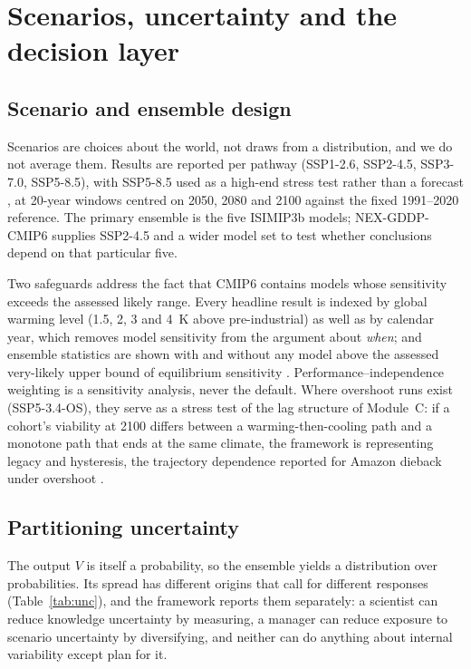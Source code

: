 \section{Scenarios, uncertainty and the decision layer}\label{sec:unc}

\subsection{Scenario and ensemble design}
Scenarios are choices about the world, not draws from a distribution, and we do not average them. Results are reported per pathway (SSP1-2.6, SSP2-4.5, SSP3-7.0, SSP5-8.5), with SSP5-8.5 used as a high-end stress test rather than a forecast \citep{Hausfather2020}, at 20-year windows centred on 2050, 2080 and 2100 against the fixed 1991--2020 reference. The primary ensemble is the five ISIMIP3b models; NEX-GDDP-CMIP6 supplies SSP2-4.5 and a wider model set to test whether conclusions depend on that particular five.

Two safeguards address the fact that CMIP6 contains models whose sensitivity exceeds the assessed likely range. Every headline result is indexed by global warming level (1.5, 2, 3 and 4~K above pre-industrial) as well as by calendar year, which removes model sensitivity from the argument about \emph{when}; and ensemble statistics are shown with and without any model above the assessed very-likely upper bound of equilibrium sensitivity \citep{Hausfather2022,Zelinka2020}. Performance--independence weighting \citep{Brunner2020} is a sensitivity analysis, never the default. Where overshoot runs exist (SSP5-3.4-OS), they serve as a stress test of the lag structure of Module~C: if a cohort's viability at 2100 differs between a warming-then-cooling path and a monotone path that ends at the same climate, the framework is representing legacy and hysteresis, the trajectory dependence reported for Amazon dieback under overshoot \citep{Munday2025}.

\subsection{Partitioning uncertainty}
The output $V$ is itself a probability, so the ensemble yields a distribution over probabilities. Its spread has different origins that call for different responses (Table~\ref{tab:unc}), and the framework reports them separately: a scientist can reduce knowledge uncertainty by measuring, a manager can reduce exposure to scenario uncertainty by diversifying, and neither can do anything about internal variability except plan for it.


